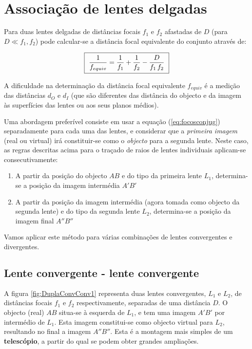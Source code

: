 \documentclass[a4paper,12pt]{article}      %
\begin{document}
\section{\sf Associação de lentes delgadas}

Para duas lentes delgadas de distâncias focais $f_1$ e $f_2$ afastadas de $D$ (para $D \ll f_1,f_2$) pode calcular-se a distância focal equivalente do conjunto através de: 

 \begin{equation}
	\label{eq:assoclentes}
    \fbox{
        $ \displaystyle
	\frac{1}{f_{equiv}} = \frac{1}{f_1} + \frac{1}{f_2} - \frac{D}{f_1 \,f_2} 
        $
    }
\end{equation}

A dificuldade
na determinação da distância focal equivalente ${f_{equiv}}$ é a medição das distâncias $d_O$ e $d_I$ 
(que são diferentes das distância do objecto e da imagem às superfícies das lentes ou aos seus planos médios).

Uma abordagem preferível consiste em usar a equação (\ref{eq:focosconjug}) separadamente para cada uma das lentes, e considerar que a \emph{primeira imagem} (real ou virtual) irá constituir-se como o \emph{objecto} para a segunda lente. Neste caso, as regras descritas acima para o traçado de raios de lentes individuais aplicam-se consecutivamente:
\begin{enumerate}
\item  A partir da posição do objecto $AB$ e do tipo da primeira lente $L_1$, determina-se a posição da imagem intermédia $A'B'$
\item  A partir da posição da imagem intermédia (agora tomada como objecto da segunda lente) e do tipo da segunda lente $L_2$, determina-se a posição da imagem final $A''B''$
\end{enumerate}
Vamos aplicar este método para várias combinações de lentes convergentes e divergentes.

\subsection{\sf Lente convergente - lente convergente}
A figura \ref{fig:DuplaConvConv1} representa duas lentes convergentes, $L_1$ e $L_2$, de distâncias focais $f_1$ e $f_2$ respectivamente, separadas de uma distância $D$. O objecto (real) $AB$ situa-se à esquerda de $L_1$, e tem uma imagem $A'B'$ por intermédio de $L_1$. Esta imagem constitui-se como objecto virtual para $L_2$, resultando no final a imagem $A''B''$. Esta é a montagem mais simples de um \textbf{telescópio}, a partir do qual se podem obter grandes ampliações.
\end{document}
